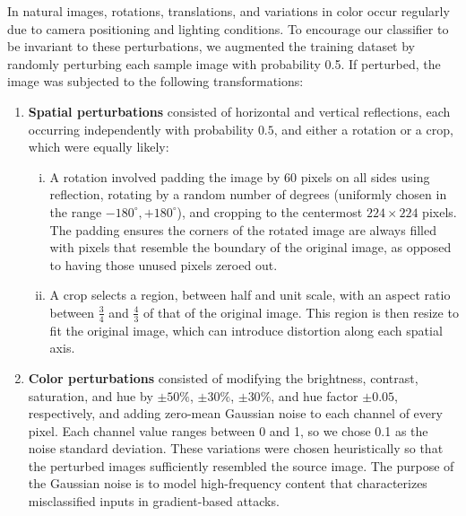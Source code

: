 \documentclass[justified]{article}
\begin{document}
  In natural images, rotations, translations, and variations in color occur regularly due to camera positioning and lighting conditions.
  To encourage our classifier to be invariant to these perturbations, we augmented the training dataset by randomly perturbing each sample image with probability 0.5. If perturbed, the image was subjected to the following transformations:
  \begin{enumerate}
  \item
    \textbf{Spatial perturbations} consisted of horizontal and vertical reflections, each occurring independently with probability $0.5$, and either a rotation or a crop, which were equally likely:
    \begin{enumerate}[(i)]
    \item
      A rotation involved padding the image by 60 pixels on all sides using reflection, rotating by a random number of degrees (uniformly chosen in the range $-180^\circ, +180^\circ$), and cropping to the centermost $224 \times 224$ pixels.
      The padding ensures the corners of the rotated image are always filled with pixels that resemble the boundary of the original image, as opposed to having those unused pixels zeroed out.

    \item
      A crop selects a region, between half and unit scale, with an aspect ratio between $\frac{3}{4}$ and $\frac{4}{3}$ of that of the original image.
      This region is then resize to fit the original image, which can introduce distortion along each spatial axis.
    \end{enumerate}

  \item
    \textbf{Color perturbations} consisted of modifying the brightness, contrast, saturation, and hue by $\pm 50\%$, $\pm 30\%$, $\pm 30\%$, and hue factor $\pm 0.05$, respectively, and adding zero-mean Gaussian noise to each channel of every pixel.
    Each channel value ranges between 0 and 1, so we chose 0.1 as the noise standard deviation.
    These variations were chosen heuristically so that the perturbed images sufficiently resembled the source image.
    The purpose of the Gaussian noise is to model high-frequency content that characterizes misclassified inputs in gradient-based attacks.
  \end{enumerate}
\end{document}
